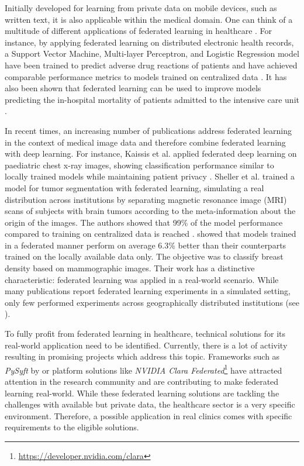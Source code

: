 Initially developed for learning from private data on mobile devices, such as written text, it is also applicable within the medical domain. One can think of a multitude of different applications of federated learning in healthcare \citep{Xu2021}. For instance, by applying federated learning on distributed electronic health records, a Support Vector Machine, Multi-layer Perceptron, and Logistic Regression model have been trained to predict adverse drug reactions of patients and have achieved comparable performance metrics to models trained on centralized data \citep{Choudhury2019PredictingLearning}. It has also been shown that federated learning can be used to improve models predicting the in-hospital mortality of patients admitted to the intensive care unit \citep{Sharma2019PreservingMortality}.

In recent times, an increasing number of publications address federated learning in the context of medical image data and therefore combine federated learning with deep learning.
For instance, Kaissis et al. applied federated deep learning on paediatric chest x-ray images, showing classification performance similar to locally trained models while maintaining patient privacy \citep{Kaissis2021End-to-endImaging}.
Sheller et al. trained a model for tumor segmentation with federated learning, simulating a real distribution across institutions by separating  magnetic resonance image (MRI) scans of subjects with brain tumors according to the meta-information about the origin of the images. The authors showed that 99\% of the model performance compared to training on centralized data is reached \citep{Sheller2020FederatedData}.
\cite{Roth2020FederatedImplementation} showed that models trained in a federated manner perform on average 6.3\% better than their counterparts trained on the locally available data only. The objective was to classify breast density based on mammographic images. Their work has a distinctive characteristic: federated learning was applied in a real-world scenario.
While many publications report federated learning experiments in a simulated setting, only few performed experiments across geographically distributed institutions (see ).

To fully profit from federated learning in healthcare, technical solutions for its real-world application need to be identified. Currently, there is a lot of activity resulting in promising projects which address this topic. Frameworks such as \textit{PySyft} by \cite{Ryffel2018ALearning} or platform solutions like \textit{NVIDIA Clara Federated}\footnote{\url{https://developer.nvidia.com/clara}} have attracted attention in the research community and are contributing to make federated learning real-world. While these federated learning solutions are tackling the challenges with available but private data, the healthcare sector is a very specific environment. Therefore, a possible application in real clinics comes with specific requirements to the eligible solutions.

